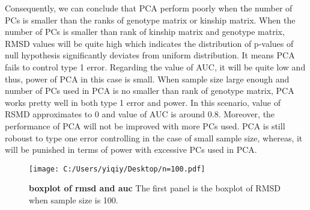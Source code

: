 \documentclass[12pt]{article}
\begin{document}
Consequently, we can conclude that PCA perform poorly when the number of PCs is smaller than the ranks of genotype matrix or kinship matrix. When the number of PCs is smaller than rank of kinship matrix and genotype matrix, RMSD values will be quite high which indicates the distribution of p-values of null hypothesis significantly deviates from uniform distribution. It means PCA fails to control type 1 error. Regarding the value of AUC, it will be quite low and thus, power of PCA in this case is small. When sample size large enough and number of PCs used in PCA is no smaller than rank of genotype matrix, PCA works pretty well in both type 1 error and power. In this scenario, value of RSMD approximates to 0 and value of AUC is around 0.8. Moreover, the performance of PCA will not be improved with more PCs used. PCA is still roboust to type one error controlling in the case of small sample size, whereas, it will be punished in terms of power with excessive PCs used in PCA. 


\begin{figure}[bp!]
  \centering
  \texttt{[image: C:/Users/yiqiy/Desktop/n=100.pdf]}
  \caption{
    {\bf boxplot of rmsd and auc}
    The first panel is the boxplot of RMSD when sample size is 100.}
  \label{fig:example}
\end{figure}
\end{document}
